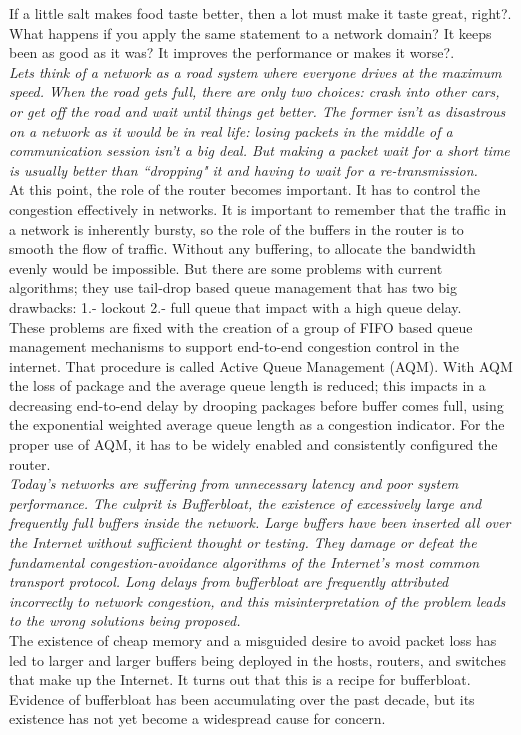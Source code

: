 If a little salt makes food taste better, then a lot must make it taste great, right?. What happens if you apply the same statement to a network domain? It keeps been as good as it was? It improves the performance or makes it worse?.\\

\textit{Lets think of a network as a road system where everyone drives at the maximum speed. When the road gets full, there are only two choices: crash into other cars, or get off the road and wait until things get better. The former isn't as disastrous on a network as it would be in real life: losing packets in the middle of a communication session isn't a big deal. But making a packet wait for a short time is usually better than ``dropping" it and having to wait for a re-transmission.}\cite{bufferarms}\\

At this point, the role of the router becomes important. It has to control the congestion effectively in networks. It is important to remember that the traffic in a network is inherently bursty, so the role of the buffers in the router is to smooth the flow of traffic. Without any buffering, to allocate the bandwidth evenly would be impossible. But there are some problems with current algorithms; they use tail-drop based queue management that has two big drawbacks: 1.- lockout 2.- full queue that impact with a high queue delay.\\

These problems are fixed with the creation of a group of FIFO based queue management mechanisms to support end-to-end congestion control in the internet. That procedure is called Active Queue Management (AQM). With AQM the loss of package and the average queue length is reduced; this impacts in a decreasing end-to-end delay by drooping packages before buffer comes full, using the exponential weighted average queue length as a congestion indicator. For the proper use of AQM, it has to be widely enabled and consistently configured the router.\\

\textit{Today's networks are suffering from unnecessary latency and poor system performance. The culprit is Bufferbloat, the existence of excessively large and frequently full buffers inside the network. Large buffers have been inserted all over the Internet without sufficient thought or testing. They damage or defeat the fundamental congestion-avoidance algorithms of the Internet's most common transport protocol. Long delays from bufferbloat are frequently attributed incorrectly to network congestion, and this misinterpretation of the problem leads to the wrong solutions being proposed.}\cite{GettysNichols}\\

The existence of cheap memory and a misguided desire to avoid packet loss has led to larger and larger buffers being deployed in the hosts, routers, and switches that make up the Internet. It turns out that this is a recipe for bufferbloat. Evidence of bufferbloat has been accumulating over the past decade, but its existence has not yet become a widespread cause for concern.\\


